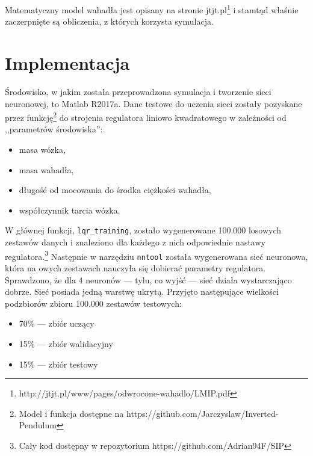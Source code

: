 \documentclass[10pt,a4paper,titlepage]{article}
\begin{document}
	Matematyczny model wahadła jest opisany na stronie jtjt.pl\footnote{http://jtjt.pl/www/pages/odwrocone-wahadlo/LMIP.pdf} i stamtąd właśnie zaczerpnięte są obliczenia, z których korzysta symulacja.
	
	\section{Implementacja}
	Środowisko, w jakim została przeprowadzona symulacja i tworzenie sieci neuronowej, to Matlab R2017a. Dane testowe do uczenia sieci zostały pozyskane przez funkcję\footnote{Model i funkcja dostępne na https://github.com/Jarczyslaw/Inverted-Pendulum} do strojenia regulatora liniowo kwadratowego w zależności od ,,parametrów środowiska'':
	\begin{itemize}
		\item masa wózka,
		\item masa wahadła,
		\item długość od mocowania do środka ciężkości wahadła,
		\item współczynnik tarcia wózka.
	\end{itemize}

	W głównej funkcji, \texttt{lqr\_training}, zostało wygenerowane 100.000 losowych zestawów danych i znaleziono dla każdego z nich odpowiednie nastawy regulatora.\footnote{Cały kod dostępny w repozytorium https://github.com/Adrian94F/SIP} Następnie w narzędziu \texttt{nntool} została wygenerowana sieć neuronowa, która na owych zestawach nauczyła się dobierać parametry regulatora. Sprawdzono, że dla 4 neuronów --- tylu, co wyjść --- sieć działa wystarczająco dobrze. Sieć posiada jedną warstwę ukrytą. Przyjęto następujące wielkości podzbiorów zbioru 100.000 zestawów testowych:
	\begin{itemize}
		\item 70\% --- zbiór uczący
		\item 15\% --- zbiór walidacyjny
		\item 15\% --- zbiór testowy
	\end{itemize}
	
\end{document}
